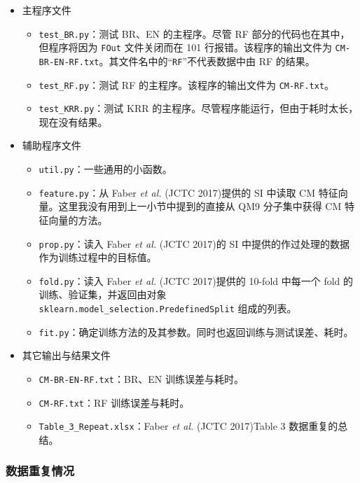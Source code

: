 \documentclass[10pt,a4paper,onecolumn]{article}
\numberwithin{equation}{section}
\begin{document}
\begin{itemize}[noitemsep]
  \item 主程序文件
  \begin{itemize}[noitemsep, nolistsep]
    \item \verb|test_BR.py|：测试 BR、EN 的主程序。尽管 RF 部分的代码也在其中，但程序将因为 \verb|FOut| 文件关闭而在 101 行报错。该程序的输出文件为 \verb|CM-BR-EN-RF.txt|。其文件名中的“\verb|RF|”不代表数据中由 RF 的结果。
    \item \verb|test_RF.py|：测试 RF 的主程序。该程序的输出文件为 \verb|CM-RF.txt|。
    \item \verb|test_KRR.py|：测试 KRR 的主程序。尽管程序能运行，但由于耗时太长，现在没有结果。
  \end{itemize}
  \item 辅助程序文件
  \begin{itemize}[noitemsep, nolistsep]
    \item \verb|util.py|：一些通用的小函数。
    \item \verb|feature.py|：从 Faber \emph{et al.} (JCTC 2017)\citep{Faber-Lilienfeld.JCTC.2017.13}提供的 SI 中读取 CM 特征向量。这里我没有用到上一小节中提到的直接从 QM9 分子集中获得 CM 特征向量的方法。
    \item \verb|prop.py|：读入 Faber \emph{et al.} (JCTC 2017)\citep{Faber-Lilienfeld.JCTC.2017.13}的 SI 中提供的作过处理的数据作为训练过程中的目标值。
    \item \verb|fold.py|：读入 Faber \emph{et al.} (JCTC 2017)\citep{Faber-Lilienfeld.JCTC.2017.13}提供的 10-fold 中每一个 fold 的训练、验证集，并返回由对象 \verb|sklearn.model_selection.PredefinedSplit| 组成的列表。
    \item \verb|fit.py|：确定训练方法的及其参数。同时也返回训练与测试误差、耗时。
  \end{itemize}
  \item 其它输出与结果文件
  \begin{itemize}[noitemsep, nolistsep]
    \item \verb|CM-BR-EN-RF.txt|：BR、EN 训练误差与耗时。
    \item \verb|CM-RF.txt|：RF 训练误差与耗时。
    \item \verb|Table_3_Repeat.xlsx|：Faber \emph{et al.} (JCTC 2017)\citep{Faber-Lilienfeld.JCTC.2017.13}Table 3 数据重复的总结。
  \end{itemize}
\end{itemize}

\subsubsection{数据重复情况}
\end{document}
